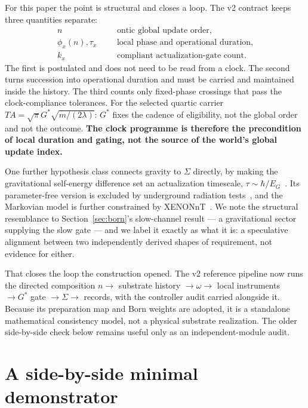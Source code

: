 \documentclass[11pt,a4paper]{article}
\theoremstyle{definition}
\theoremstyle{plain}
\theoremstyle{remark}
\begin{document}
For this paper the point is structural and closes a loop. The v2 contract
keeps three quantities separate:
\begin{equation}
 \begin{aligned}
 n& &&\text{ontic global update order},\\
 \phi_x(n),\tau_x& &&\text{local phase and operational duration},\\
 k_x& &&\text{compliant actualization-gate count}.
 \end{aligned}
\end{equation}
The first is postulated and does not need to be read from a clock. The second
turns succession into operational duration and must be carried and maintained
inside the history. The third counts only fixed-phase crossings that pass the
clock-compliance tolerances. For the selected quartic carrier
$TA=\sqrt\pi G^*\sqrt{m/(2\lambda)}$: $G^*$ fixes the cadence of eligibility,
not the global order and not the outcome. \textbf{The clock programme is
therefore the precondition of local duration and gating, not the source of
the world's global update index.}

One further hypothesis class connects gravity to $\Sigma$ directly, by
making the gravitational self-energy difference set an actualization
timescale, $\tau \sim \hbar/E_G$~\cite{diosi,penrose}. Its
parameter-free version is excluded by underground radiation
tests~\cite{donadi}, and the Markovian model is further constrained by
XENONnT~\cite{xenon}. We note the structural resemblance to
Section~\ref{sec:born}'s slow-channel result --- a gravitational sector
supplying the slow gate --- and we label it exactly as what it is: a
speculative alignment between two independently derived shapes of
requirement, not evidence for either.

That closes the loop the construction opened. The v2 reference pipeline now
runs the directed composition
$n\to$ substrate history $\to\omega\to$ local instruments $\to G^*$ gate
$\to\Sigma\to$ records, with the controller audit carried alongside it.
Because its preparation map and Born weights are adopted, it is a standalone
mathematical consistency model, not a physical substrate realization. The
older side-by-side check below remains useful only as an independent-module
audit.

\section{A side-by-side minimal demonstrator}
\label{sec:toy}
\end{document}
